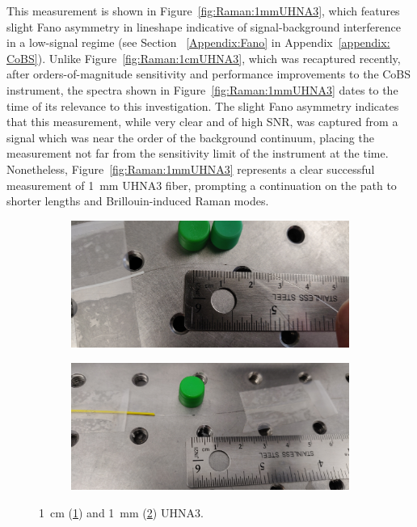 This measurement is shown in Figure~\ref{fig:Raman:1mmUHNA3}, which features slight Fano asymmetry in lineshape indicative of signal-background interference in a low-signal regime (see Section ~\ref{Appendix:Fano} in Appendix~\ref{appendix: CoBS}). Unlike Figure~\ref{fig:Raman:1cmUHNA3}, which was recaptured recently, after orders-of-magnitude sensitivity and performance improvements to the \ac{CoBS} instrument, the spectra shown in Figure~\ref{fig:Raman:1mmUHNA3} dates to the time of its relevance to this investigation. The slight Fano asymmetry indicates that this measurement, while very clear and of high SNR, was captured from a signal which was near the order of the background continuum, placing the measurement not far from the sensitivity limit of the instrument at the time. Nonetheless, Figure~\ref{fig:Raman:1mmUHNA3} represents a clear successful measurement of \SI{1}{\milli\meter} \ac{UHNA3} fiber, prompting a continuation on the path to shorter lengths and Brillouin-induced Raman modes.

\begin{figure}[t]
    \centering
    \begin{subfigure}[b]{0.49\textwidth}
        \centering
        \includegraphics[width=\textwidth]{figs/4-Raman/1cm UHNA3.jpeg}
        \caption{}
        \label{fig:Raman:1cmUHNA3pic}
    \end{subfigure}
    \hfill
    \begin{subfigure}[b]{0.49\textwidth}
        \centering
        \includegraphics[width=\textwidth]{figs/4-Raman/1mm UHNA3 in apparatus.jpeg}
        \caption{}
        \label{fig:Raman:1mmUHNA3pic}
    \end{subfigure}
    \caption{\SI{1}{\centi\meter} (\ref{fig:Raman:1cmUHNA3pic}) and \SI{1}{\milli\meter} (\ref{fig:Raman:1mmUHNA3pic}) \ac{UHNA3}.}
    \label{fig:Raman:UHNA3}
\end{figure}

